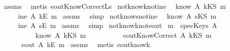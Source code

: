 \begin{isabellebody}
\ assms\ \isamarkupfalse%
\ {\isacharparenleft}metis\ eoutKnowCorrect{\isacharunderscore}L{}s{\isacharparenright}%
\endisatagproof
{\isafoldproof}%
%
\isadelimproof
\isanewline
%
\endisadelimproof
\isanewline
{}\isamarkupfalse%
\ not{\isacharunderscore}know{\isacharunderscore}k{\isacharunderscore}not{\isacharunderscore}ine{\isacharcolon}\isanewline
{}\ {\isachardoublequoteopen}{\isasymnot}\ know\ A\ {\isacharparenleft}kKS\ m{\isacharparenright}{\isachardoublequoteclose}\isanewline
{}\ \ \ \ {\isachardoublequoteopen}{\isasymnot}\ ine\ A\ {\isacharparenleft}kE\ m{\isacharparenright}{\isachardoublequoteclose}\isanewline
%
\isadelimproof
%
\endisadelimproof
%
\isatagproof
{}\isamarkupfalse%
\ assms\ \isamarkupfalse%
\ simp%
\endisatagproof
{\isafoldproof}%
%
\isadelimproof
\isanewline
%
\endisadelimproof
\isanewline
{}\isamarkupfalse%
\ not{\isacharunderscore}know{\isacharunderscore}s{\isacharunderscore}not{\isacharunderscore}ine{\isacharcolon}\isanewline
{}\ {\isachardoublequoteopen}{\isasymnot}\ know\ A\ {\isacharparenleft}sKS\ m{\isacharparenright}{\isachardoublequoteclose}\isanewline
{}\ \ \ \ {\isachardoublequoteopen}{\isasymnot}\ ine\ A\ {\isacharparenleft}sE\ m{\isacharparenright}{\isachardoublequoteclose}\isanewline
%
\isadelimproof
%
\endisadelimproof
%
\isatagproof
{}\isamarkupfalse%
\ assms\ \isamarkupfalse%
\ simp%
\endisatagproof
{\isafoldproof}%
%
\isadelimproof
\isanewline
%
\endisadelimproof
\isanewline
{}\isamarkupfalse%
\ not{\isacharunderscore}know{\isacharunderscore}k{\isacharunderscore}not{\isacharunderscore}eout{\isacharcolon}\isanewline
{}\ {\isachardoublequoteopen}m\ {\isasymnotin}\ specKeys\ A{\isachardoublequoteclose}\isanewline
\ \ \ \ \ \ \ \ \ {\isachardoublequoteopen}{\isasymnot}\ know\ A\ {\isacharparenleft}kKS\ m{\isacharparenright}{\isachardoublequoteclose}\ \isanewline
\ \ \ \ \ \ \ \ \ {\isachardoublequoteopen}eoutKnowCorrect\ A\ {\isacharparenleft}kKS\ m{\isacharparenright}{\isachardoublequoteclose}\isanewline
{}\ \ \ \ \ {\isachardoublequoteopen}{\isasymnot}\ eout\ A\ {\isacharparenleft}kE\ m{\isacharparenright}{\isachardoublequoteclose}\isanewline
%
\isadelimproof
%
\endisadelimproof
%
\isatagproof
{}\isamarkupfalse%
\ assms\ \isamarkupfalse%
\ {\isacharparenleft}metis\ eout{\isacharunderscore}know{\isacharunderscore}k{\isacharparenright}%

\end{isabellebody}
